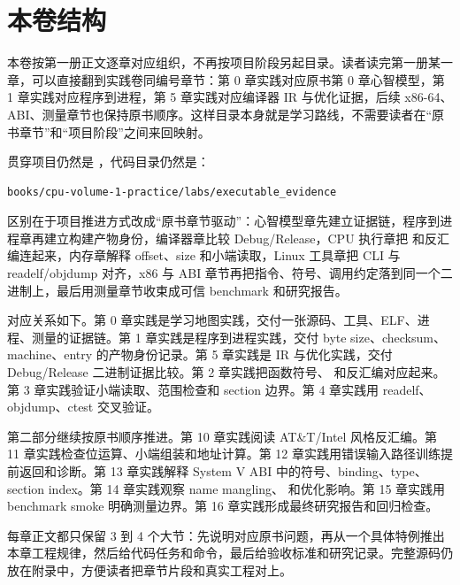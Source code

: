 \chapter*{本卷结构}
{}

本卷按第一册正文逐章对应组织，不再按项目阶段另起目录。读者读完第一册某一章，可以直接翻到实践卷同编号章节：第 0 章实践对应原书第 0 章心智模型，第 1 章实践对应程序到进程，第 5 章实践对应编译器 IR 与优化证据，后续 x86-64、ABI、测量章节也保持原书顺序。这样目录本身就是学习路线，不需要读者在“原书章节”和“项目阶段”之间来回映射。

贯穿项目仍然是 ，代码目录仍然是：

\begin{lstlisting}[language=bash]
books/cpu-volume-1-practice/labs/executable_evidence
\end{lstlisting}

区别在于项目推进方式改成“原书章节驱动”：心智模型章先建立证据链，程序到进程章再建立构建产物身份，编译器章比较 Debug/Release，CPU 执行章把  和反汇编连起来，内存章解释 offset、size 和小端读取，Linux 工具章把 CLI 与 readelf/objdump 对齐，x86 与 ABI 章节再把指令、符号、调用约定落到同一个二进制上，最后用测量章节收束成可信 benchmark 和研究报告。

对应关系如下。第 0 章实践是学习地图实践，交付一张源码、工具、ELF、进程、测量的证据链。第 1 章实践是程序到进程实践，交付 byte size、checksum、machine、entry 的产物身份记录。第 5 章实践是 IR 与优化实践，交付 Debug/Release 二进制证据比较。第 2 章实践把函数符号、 和反汇编对应起来。第 3 章实践验证小端读取、范围检查和 section 边界。第 4 章实践用 readelf、objdump、ctest 交叉验证。

第二部分继续按原书顺序推进。第 10 章实践阅读 AT\&T/Intel 风格反汇编。第 11 章实践检查位运算、小端组装和地址计算。第 12 章实践用错误输入路径训练提前返回和诊断。第 13 章实践解释 System V ABI 中的符号、binding、type、section index。第 14 章实践观察 name mangling、 和优化影响。第 15 章实践用 benchmark smoke 明确测量边界。第 16 章实践形成最终研究报告和回归检查。

每章正文都只保留 3 到 4 个大节：先说明对应原书问题，再从一个具体特例推出本章工程规律，然后给代码任务和命令，最后给验收标准和研究记录。完整源码仍放在附录中，方便读者把章节片段和真实工程对上。
